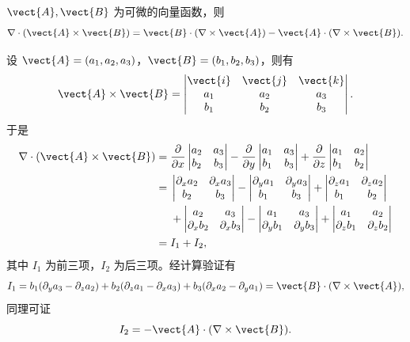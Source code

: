 \begin{xexample}[26.1.3]
$\vect{A},\vect{B}$ 为可微的向量函数，则
\[
  \nabla\cdot(\vect{A}\times\vect{B})
  =\vect{B}\cdot(\nabla\times\vect{A})-\vect{A}\cdot(\nabla\times\vect{B}).
\]
\end{xexample}
\begin{xproof}
设 $\vect{A}=(a_1,a_2,a_3)$，$\vect{B}=(b_1,b_2,b_3)$，则有
\[
  \vect{A}\times\vect{B}
  =\begin{vmatrix}
    \vect{i}&\vect{j}&\vect{k}\\
    a_1&a_2&a_3\\
    b_1&b_2&b_3
  \end{vmatrix}.
\]
于是
\begin{align*}
  \nabla\cdot(\vect{A}\times\vect{B})
  ={}&\frac{\partial}{\partial x}\begin{vmatrix}a_2&a_3\\b_2&b_3\end{vmatrix}
  -\frac{\partial}{\partial y}\begin{vmatrix}a_1&a_3\\b_1&b_3\end{vmatrix}
  +\frac{\partial}{\partial z}\begin{vmatrix}a_1&a_2\\b_1&b_2\end{vmatrix}\\
  ={}&\begin{vmatrix}\partial_xa_2&\partial_xa_3\\b_2&b_3\end{vmatrix}
  -\begin{vmatrix}\partial_ya_1&\partial_ya_3\\b_1&b_3\end{vmatrix}
  +\begin{vmatrix}\partial_za_1&\partial_za_2\\b_1&b_2\end{vmatrix}\\
  &+\begin{vmatrix}a_2&a_3\\\partial_xb_2&\partial_xb_3\end{vmatrix}
  -\begin{vmatrix}a_1&a_3\\\partial_yb_1&\partial_yb_3\end{vmatrix}
  +\begin{vmatrix}a_1&a_2\\\partial_zb_1&\partial_zb_2\end{vmatrix}\\
  ={}&I_1+I_2,
\end{align*}
其中 $I_1$ 为前三项，$I_2$ 为后三项。经计算验证有
\[
  I_1=b_1(\partial_ya_3-\partial_za_2)+b_2(\partial_za_1-\partial_xa_3)+b_3(\partial_xa_2-\partial_ya_1)
  =\vect{B}\cdot(\nabla\times\vect{A}),
\]
同理可证
\[
  I_2=-\vect{A}\cdot(\nabla\times\vect{B}).
\]
\end{xproof}

